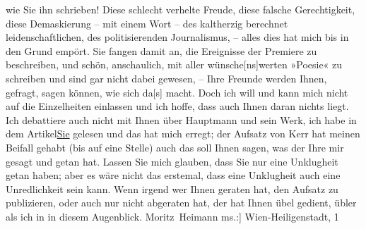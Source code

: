 \begin{ledgroupsized}[t]{13cm}
               wie Sie ihn schrieben! Diese schlecht verhelte Freude, diese falsche Gerechtigkeit,
               diese Demaskierung – mit einem Wort – des kaltherzig berechnet leidenschaftlichen,
               des politisierenden Journalismus, – alles dies hat mich bis in den Grund empört. Sie
               fangen damit an, die Ereignisse der Premiere zu beschreiben, und schön, anschaulich,
               mit aller wünsche{[}ns{]}werten »Poesie« zu schreiben und sind gar
               nicht dabei gewesen, – Ihre Freunde werden Ihnen, gefragt, sagen können, wie sich
                  da{[}s{]} macht. Doch ich will und kann mich nicht auf die
               Einzelheiten einlassen und ich hoffe, dass auch Ihnen daran nichts liegt. Ich
               debattiere auch nicht mit Ihnen über Hauptmann
               und sein Werk, ich habe in dem Artikel\uline{Sie} gelesen und das hat mich erregt; der Aufsatz von Kerr hat meinen Beifall gehabt (bis auf eine
               Stelle) auch das soll Ihnen sagen, was der Ihre mir gesagt und getan hat.\pend
           \pstart
           Lassen Sie mich glauben, dass Sie nur eine Unklugheit getan haben; aber es wäre nicht
               das erstemal, dass eine Unklugheit auch eine Unredlichkeit sein kann. Wenn irgend wer
               Ihnen geraten hat, den Aufsatz zu publizieren, oder auch nur nicht abgeraten hat, der
               hat Ihnen übel gedient, übler als ich in in diesem Augenblick.\pend
           \pstart \spacefill\mbox{Moritz Heimann}\pend{}{\bigskip}\pstart
           \raggedleft{}{\pb}{[}ms.:{]} Wien-Heiligenstadt, 1\label{K_L03438-11v}
\end{ledgroupsized}
